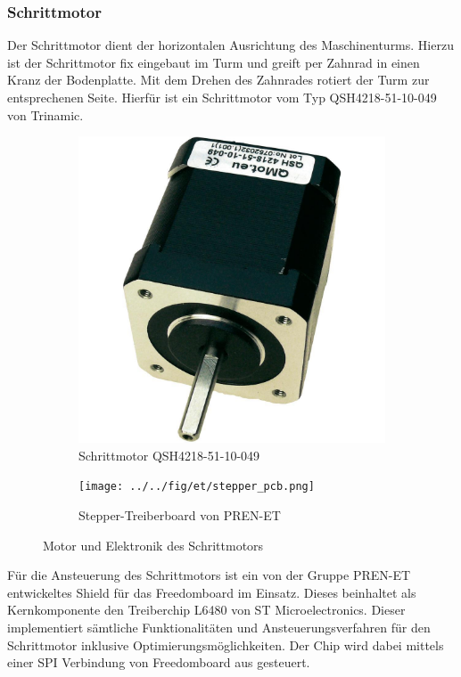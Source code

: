\subsubsection{Schrittmotor}
Der Schrittmotor dient der horizontalen Ausrichtung des Maschinenturms.
Hierzu ist der Schrittmotor fix eingebaut im Turm und greift per Zahnrad
in einen Kranz der Bodenplatte. Mit dem Drehen des Zahnrades rotiert der
Turm zur entsprechenen Seite. Hierfür ist ein Schrittmotor vom Typ 
QSH4218-51-10-049 von Trinamic.

\begin{figure}[h!]
	\centering
	\begin{subfigure}[b]{0.45\textwidth}
		\centering
		\includegraphics[width=1\textwidth]{../../fig/et/QSH4218-51-10-049.jpg}
		\caption{Schrittmotor QSH4218-51-10-049}
	\end{subfigure}
	\begin{subfigure}[b]{0.45\textwidth}
		\centering
		\texttt{[image: ../../fig/et/stepper\_pcb.png]}
		\caption{Stepper-Treiberboard von PREN-ET}
	\end{subfigure}
	\caption{Motor und Elektronik des Schrittmotors}
\end{figure}

Für die Ansteuerung des Schrittmotors ist ein von der Gruppe PREN-ET
entwickeltes Shield für das Freedomboard im Einsatz. Dieses beinhaltet
als Kernkomponente den Treiberchip L6480 von ST Microelectronics. Dieser
implementiert sämtliche Funktionalitäten und Ansteuerungsverfahren für den
Schrittmotor inklusive Optimierungsmöglichkeiten. Der Chip wird dabei
mittels einer SPI Verbindung von Freedomboard aus gesteuert.
